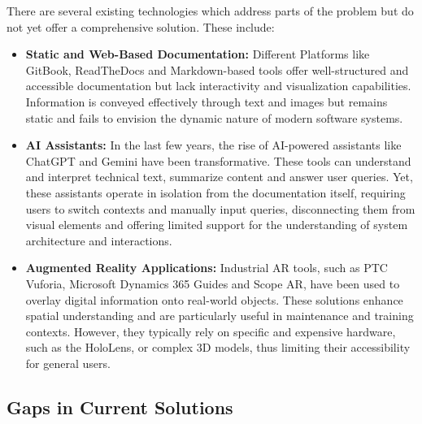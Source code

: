 \documentclass[12pt]{article}
\begin{document}
    There are several existing technologies which address parts of the problem but do not yet offer a comprehensive solution. These include:
        \begin{itemize}
            \item \textbf{Static and Web-Based Documentation:}
                Different Platforms like GitBook, ReadTheDocs and Markdown-based tools offer well-structured and accessible documentation but lack interactivity and visualization capabilities. Information is conveyed effectively through text and images
                but remains static and fails to envision the dynamic nature of modern software systems.
            \item \textbf{AI Assistants:}
                In the last few years, the rise of AI-powered assistants like ChatGPT and Gemini have been transformative. These tools can understand and interpret technical text, summarize content and answer user queries. Yet, these
                assistants operate in isolation from the documentation itself, requiring users to switch contexts and manually input queries, disconnecting them from visual elements and offering limited support for the understanding of
                system architecture and interactions.
            \item \textbf{Augmented Reality Applications:}
                Industrial AR tools, such as PTC Vuforia, Microsoft Dynamics 365 Guides and Scope AR, have been used to overlay digital information onto real-world objects. These solutions enhance spatial understanding and are particularly useful in maintenance
                and training contexts. However, they typically rely on specific and expensive hardware, such as the HoloLens, or complex 3D models, thus limiting their accessibility for general users.
        \end{itemize}

    \subsection{Gaps in Current Solutions}
\end{document}

